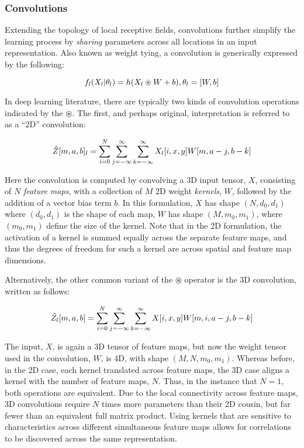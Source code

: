 \subsubsection{Convolutions}

Extending the topology of local receptive fields, convolutions further simplify the learning process by \emph{sharing} parameters across all locations in an input representation.
Also known as weight tying, a convolution is generically expressed by the following:

\begin{equation}
\label{eq:convlayer}
\small
f_l(X_l \vert \theta_l) = h(X_{l} \circledast W + b), \theta_l = [W, b]
\end{equation}

\noindent In deep learning literature, there are typically two kinds of convolution operations indicated by the $\circledast$.
The first, and perhaps original, interpretation is referred to as a ``2D'' convolution:

\begin{equation}
\label{eq:convolution}
\small
\hat{Z}[m, a, b]_l =\sum_{i=0}^{N} \sum_{j=-\infty}^{\infty} \sum_{k=-\infty}^{\infty} X_l[i, x, y]W[m, a - j, b - k]
\end{equation}

\noindent Here the convolution is computed by convolving a 3D input tensor, $X$, consisting of $N$ \emph{feature maps}, with a collection of $M$ 2D weight \emph{kernels}, $W$, followed by the addition of a vector bias term $b$.
In this formulation, $X$ has shape $(N, d_0, d_1)$ where $(d_0,d_1)$ is the shape of each map, $W$ has shape $(M, m_0, m_1)$, where $(m_0,m_1)$ define the size of the kernel.
Note that in the 2D formulation, the activation of a kernel is summed equally across the separate feature maps, and thus the degrees of freedom for such a kernel are across spatial and feature map dimensions.

Alternatively, the other common variant of the $\circledast$ operator is the 3D convolution, written as follows:

\begin{equation}
\label{eq:convolution}
\small
\hat{Z}_l[m, a, b] =\sum_{i=0}^{N} \sum_{j=-\infty}^{\infty} \sum_{k=-\infty}^{\infty} X[i, x, y]W[m, i, a - j, b - k]
\end{equation}

\noindent The input, $X$, is again a 3D tensor of feature maps, but now the weight tensor used in the convolution, $W$, is 4D, with shape $(M, N, m_0, m_1)$.
Whereas before, in the 2D case, each kernel translated across feature maps, the 3D case aligns a kernel with the number of feature maps, $N$.
Thus, in the instance that $N=1$, both operations are equivalent.
Due to the local connectivity across feature maps, 3D convolutions require $N$ times more parameters than their 2D cousin, but far fewer than an equivalent full matrix product.
Using kernels that are sensitive to characteristics across different simultaneous feature maps allows for correlations to be discovered across the same representation.


